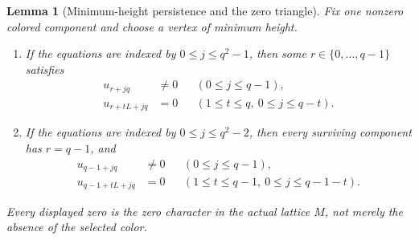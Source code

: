 \documentclass[11pt]{article}
\newtheorem{lemma}{Lemma}[section]
\theoremstyle{remark}
\numberwithin{equation}{section}
\begin{document}
\begin{lemma}[Minimum-height persistence and the zero triangle]\label{lem:minimum-height}
Fix one nonzero colored component and choose a vertex of minimum height.
\begin{enumerate}
\item If the equations are indexed by \(0\leq j\leq q^2-1\), then some \(r\in\{0,\ldots,q-1\}\) satisfies
\begin{align}
 u_{r+jq}&\neq0 &&(0\leq j\leq q-1), \label{eq:full-B-column}\\
 u_{r+tL+jq}&=0 &&(1\leq t\leq q,\ 0\leq j\leq q-t).
 \label{eq:full-zero-triangle}
\end{align}
\item If the equations are indexed by \(0\leq j\leq q^2-2\), then every surviving component has \(r=q-1\), and
\begin{align}
 u_{q-1+jq}&\neq0 &&(0\leq j\leq q-1), \label{eq:short-B-column}\\
 u_{q-1+tL+jq}&=0
   &&(1\leq t\leq q-1,\ 0\leq j\leq q-1-t).
 \label{eq:short-zero-triangle}
\end{align}
\end{enumerate}
Every displayed zero is the zero character in the actual lattice \(M\), not merely the absence of the selected color.
\end{lemma}
\end{document}
